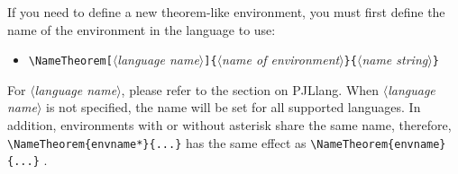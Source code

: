 \documentclass[allowbf,regionalref,puretext]{lebhart}
\providecommand{\meta}[1]{$\langle${\normalfont\itshape#1}$\rangle$}
\newenvironment{tip}[1][Tip]{%
    \begin{tcolorbox}[breakable,
        enhanced,
        width = \textwidth,
        colback = paper, colbacktitle = paper,
        colframe = gray!50, boxrule=0.2mm,
        coltitle = black,
        fonttitle = \sffamily,
        attach boxed title to top left = {yshift=-\tcboxedtitleheight/2, xshift=.5cm},
        boxed title style = {boxrule=0pt, colframe=paper},
        before skip = 0.3cm,
        after skip = 0.3cm,
        top = 3mm,
        bottom = 3mm,
        title={\scshape\sffamily #1}]%
}{\end{tcolorbox}}
\providecommand{\PJLlang}{\textsf{PJLlang}}
\begin{document}
If you need to define a new theorem-like environment, you must first define the name of the environment in the language to use:
\begin{itemize}
    \item \lstinline|\NameTheorem[|\meta{language name}\lstinline|]{|\meta{name of environment}\lstinline|}{|\meta{name string}\lstinline|}|
\end{itemize}
For \meta{language name}, please refer to the section on \PJLlang{}. When \meta{language name} is not specified, the name will be set for all supported languages. In addition, environments with or without asterisk share the same name, therefore, \lstinline|\NameTheorem{envname*}{...}| has the same effect as \lstinline|\NameTheorem{envname}{...}| .
\end{document}

